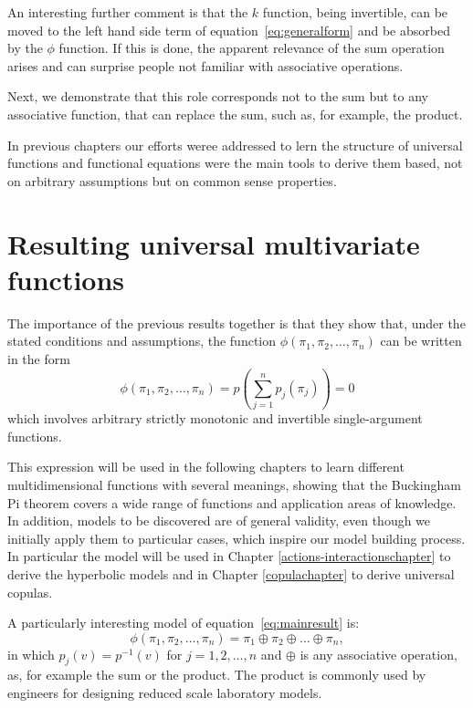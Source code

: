 \documentclass[
	11pt, %
	fleqn, %
	a4paper, %
]{LegrandOrangeBook}
\begin{document}
An interesting further comment is that the $k$ function, being invertible, can be moved to the left hand side term of equation~\ref{eq:generalform} and be absorbed by the $\phi$ function. If this is done, the apparent relevance of the sum operation arises and can surprise people not familiar with associative operations.

Next, we demonstrate that this role corresponds not to the sum but to any associative function, that can replace the sum, such as, for example, the product.



In previous chapters our efforts weree addressed to lern the structure of universal functions and functional equations were the main tools to derive them based, not on arbitrary assumptions but on common sense properties.
\section{Resulting universal multivariate functions}
The importance of the previous results together is that they show that, under the stated conditions and assumptions, the function $\phi(\pi_1,\pi_2,\ldots,\pi_n)$ can be written in the form
\begin{equation}\label{eq:mainresult}
\boxed{\phi(\pi_1,\pi_2,\ldots,\pi_n) = p\left(\sum_{j=1}^n p_j(\pi_j)\right) = 0}
\end{equation}
which involves arbitrary strictly monotonic and invertible single-argument functions.

This expression will be used in the following chapters to learn different multidimensional functions with several meanings, showing that the Buckingham Pi theorem covers a wide range of functions and application areas of knowledge. In addition, models to be discovered are of general validity, even though we initially apply them to particular cases, which inspire our model building process. In particular the model will be used in Chapter \ref{actions-interactionschapter} to derive the hyperbolic models and in Chapter \ref{copulachapter} to derive universal copulas.

A particularly interesting model of equation~\eqref{eq:mainresult} is:
\begin{equation}
\phi(\pi_1,\pi_2,\ldots,\pi_n) = \pi_1 \oplus \pi_2 \oplus \ldots \oplus \pi_n,
\label{eq:associativemodel}
\end{equation}
in which $p_j(v) = p^{-1}(v)$ for $j = 1,2,\ldots,n$ and $\oplus$ is any associative operation, as, for example the sum or the product. The product is commonly used by engineers for designing reduced scale laboratory models.
\end{document}
